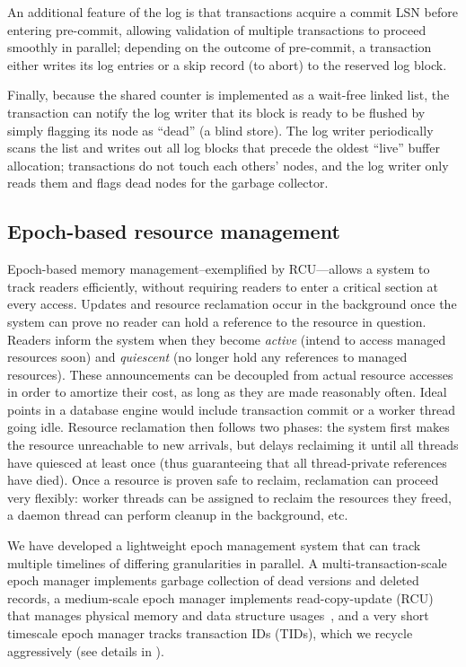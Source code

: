 An additional feature of the log is that transactions acquire a commit LSN before entering pre-commit, allowing validation of multiple transactions to proceed smoothly in parallel; depending on the outcome of pre-commit, a transaction either writes its log entries or a skip record (to abort) to the reserved log block.

Finally, because the shared counter is implemented as a wait-free linked list, the transaction can notify the log writer that its block is ready to be flushed by simply flagging its node as ``dead'' (a blind store). The log writer periodically scans the list and writes out all log blocks that precede the oldest ``live'' buffer allocation; transactions do not touch each others' nodes, and the log writer only reads them and flags dead nodes for the garbage collector.

\subsection{Epoch-based resource management}

Epoch-based memory management--exemplified by RCU\cite{McKenneyS98}---allows a system to track readers efficiently, without requiring readers to enter a critical section at every access. Updates and resource reclamation occur in the background once the system can prove no reader can hold a reference to the resource in question. Readers inform the system when they become {\em active} (intend to access managed resources soon) and {\em quiescent} (no longer hold any references to managed resources). These announcements can be decoupled from actual resource accesses in order to amortize their cost, as long as they are made reasonably often. Ideal points in a database engine would include transaction commit or a worker thread going idle. Resource reclamation then follows two phases: the system first makes the resource unreachable to new arrivals, but delays reclaiming it until all threads have quiesced at least once (thus guaranteeing that all thread-private references have died). Once a resource is proven safe to reclaim, reclamation can proceed very flexibly: worker threads can be assigned to reclaim the resources they freed, a daemon thread can perform cleanup in the background, etc. 

We have developed a lightweight epoch management system that can track multiple timelines of differing granularities in parallel. A multi-transaction-scale epoch manager implements garbage collection of dead versions and deleted records, a medium-scale epoch manager implements read-copy-update (RCU) that manages physical memory and data structure usages~\cite{McKenneyS98}, and a very short timescale epoch manager tracks transaction IDs (TIDs), which we recycle aggressively (see details in ).

